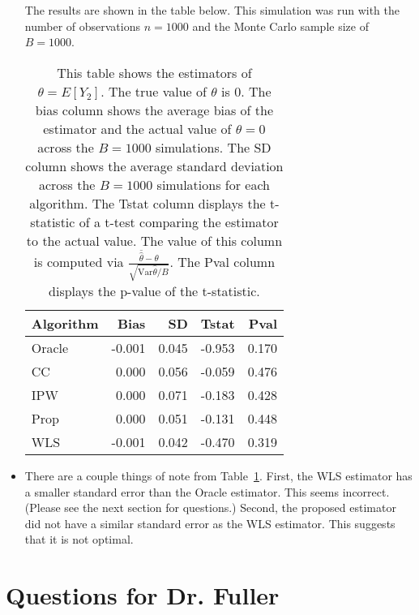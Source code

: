 \documentclass[12pt]{article}
\newcommand{\Var}{{\text{Var}}}
\begin{document}
\begin{itemize}
    The results are shown in the table below. This simulation was run with the 
    number of observations $n = 1000$ and the Monte Carlo sample size of 
    $B = 1000$.

    \begin{table}[ht!]
      \centering
      \caption{This table shows the estimators of $\theta = E[Y_2]$. The true 
      value of $\theta$ is $0$. The bias column shows the average bias of the 
      estimator and the actual value of $\theta = 0$ across the $B = 1000$ 
      simulations. The SD column shows the average standard deviation across the 
      $B = 1000$ simulations for each algorithm. The Tstat column displays the 
      t-statistic of a t-test comparing the estimator to the actual value. 
      The value of this column is computed via $\frac{\bar{\hat{\theta}} - 
      \theta}{\sqrt{\Var{\hat \theta}/B}}$. The Pval column displays the 
      p-value of the t-statistic.}
      \begin{tabular}[t]{lrrrr}
        \toprule
        Algorithm & Bias & SD & Tstat & Pval\\
        \midrule
        Oracle & -0.001 & 0.045 & -0.953 & 0.170\\
        CC & 0.000 & 0.056 & -0.059 & 0.476\\
        IPW & 0.000 & 0.071 & -0.183 & 0.428\\
        Prop & 0.000 & 0.051 & -0.131 & 0.448\\
        WLS & -0.001 & 0.042 & -0.470 & 0.319\\
        \bottomrule
      \end{tabular}
      \label{tab:res}
    \end{table}

  \item There are a couple things of note from Table~\ref{tab:res}. First, the 
    WLS estimator has a smaller standard error than the Oracle estimator. This 
    seems incorrect. (Please see the next section for questions.) Second, the 
    proposed estimator did not have a similar standard error as the WLS estimator.
    This suggests that it is not optimal.
\end{itemize}

\section*{Questions for Dr. Fuller}
\end{document}
